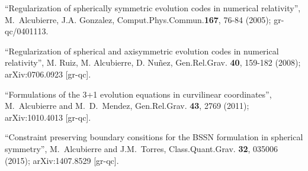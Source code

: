 \documentclass[12pt]{article}
\begin{document}
\begin{thebibliography}{99}

 ``Regularization of spherically symmetric
  evolution codes in numerical relativity'', M.~Alcubierre,
  J.A. Gonzalez, Comput.Phys.Commun.{\bf 167}, 76-84 (2005);
  gr-qc/0401113.

 ``Regularization of spherical and axisymmetric
  evolution codes in numerical relativity'', M. Ruiz, M. Alcubierre,
  D. Nuñez, Gen.Rel.Grav. {\bf 40}, 159-182 (2008); arXiv:0706.0923
  [gr-qc].

 ``Formulations of the 3+1 evolution equations
  in curvilinear coordinates'', M.~Alcubierre and M.~D.~Mendez,
  Gen.Rel.Grav. {\bf 43}, 2769 (2011); arXiv:1010.4013 [gr-qc].

 ``Constraint preserving boundary consitions for
  the BSSN formulation in spherical symmetry'', M.~Alcubierre and
  J.M.~Torres, Class.Quant.Grav. {\bf 32}, 035006 (2015);
  arXiv:1407.8529 [gr-qc].

\end{thebibliography}


\end{document}
